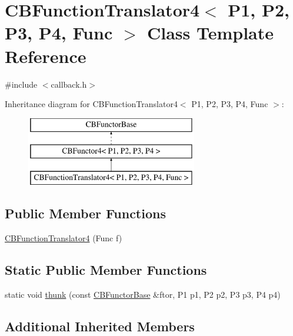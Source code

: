 \hypertarget{class_c_b_function_translator4}{\section{C\+B\+Function\+Translator4$<$ P1, P2, P3, P4, Func $>$ Class Template Reference}
\label{class_c_b_function_translator4}
}


{\ttfamily \#include $<$callback.\+h$>$}

Inheritance diagram for C\+B\+Function\+Translator4$<$ P1, P2, P3, P4, Func $>$\+:\begin{figure}[H]
\begin{center}
\leavevmode
\includegraphics[height=3.000000cm]{class_c_b_function_translator4}
\end{center}
\end{figure}
\subsection*{Public Member Functions}
\begin{DoxyCompactItemize}
\item 
\hyperlink{class_c_b_function_translator4_ae810433e97712ca1cc6fc0f45d49dc31}{C\+B\+Function\+Translator4} (Func f)
\end{DoxyCompactItemize}
\subsection*{Static Public Member Functions}
\begin{DoxyCompactItemize}
\item 
static void \hyperlink{class_c_b_function_translator4_aca29fc798d6345156a1375d66713dc96}{thunk} (const \hyperlink{class_c_b_functor_base}{C\+B\+Functor\+Base} \&ftor, P1 p1, P2 p2, P3 p3, P4 p4)
\end{DoxyCompactItemize}
\subsection*{Additional Inherited Members}


